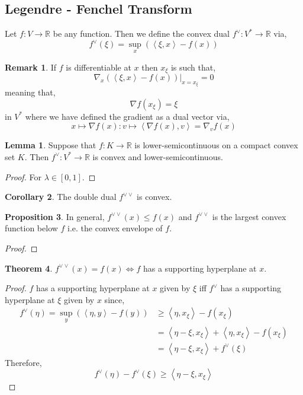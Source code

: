 \documentclass[12pt]{extarticle}
\newcommand{\R}{\mathbb{R}}
\theoremstyle{definition}
\newtheorem{theorem}{Theorem}[section]
\newtheorem{lemma}[theorem]{Lemma}
\newtheorem{proposition}[theorem]{Proposition}
\newtheorem{corollary}[theorem]{Corollary}
\newtheorem{remark}{Remark}
\newenvironment{definition}[1][Definition:]{\begin{trivlist}
\item[\hskip \labelsep {\bfseries #1}]}{\end{trivlist}}
\newcommand{\inner}[2]{\left< #1, #2 \right>}
\begin{document}
\subsection{Legendre - Fenchel Transform}

\begin{definition}
Let $f : V \to \R$ be any function. Then we define the convex dual $f^\vee : V^* \to \R$ via,
\[ f^\vee(\xi) = \sup_x \left( \inner{\xi}{x} - f(x) \right) \]
\end{definition}

\begin{remark}
If $f$ is differentiable at $x$ then $x_\xi$ is such that,
\[ \nabla_x \left( \inner{\xi}{x} - f(x) \right) \Big|_{x = x_\xi} = 0 \]
meaning that,
\[ \nabla f (x_\xi) = \xi \]
in $V^*$ where we have defined the gradient as a dual vector via,
\[ x \mapsto \nabla f(x) : v \mapsto \inner{\nabla f(x)}{v} = \nabla_v f(x) \]
\end{remark}

\begin{lemma}
Suppose that $f : K \to \R$ is lower-semicontinuous on a compact convex set $K$. Then $f^\vee : V^* \to \R$ is convex and lower-semicontinuous.
\end{lemma}

\begin{proof}
For $\lambda \in [0, 1]$. 
\end{proof}

\begin{corollary}
The double dual $f^{\vee \vee}$ is convex.
\end{corollary}

\begin{proposition}
In general, $f^{\vee \vee}(x) \le f(x)$ and $f^{\vee \vee}$ is the largest convex function below $f$ i.e. the convex envelope of $f$. 
\end{proposition}

\begin{proof}

\end{proof}

\begin{theorem}
$f^{\vee \vee}(x) = f(x) \iff f$ has a supporting hyperplane at $x$.
\end{theorem}

\begin{proof}
$f$ has a supporting hyperplane at $x$ given by $\xi$ iff $f^\vee$ has a supporting hyperplane at $\xi$ given by $x$ since,
\begin{align*}
f^\vee(\eta) = \sup_y \left( \inner{\eta}{y} - f(y) \right) & \ge \inner{\eta}{x_\xi} - f(x_\xi) 
\\
& = \inner{\eta - \xi}{x_\xi} + \inner{\eta}{x_\xi} - f(x_\xi) 
\\
& = \inner{\eta - \xi}{x_\xi} + f^\vee(\xi) 
\end{align*}
Therefore,
\[ f^\vee(\eta) - f^\vee(\xi) \ge \inner{\eta - \xi}{x_\xi} \]
\end{proof}
\end{document}
